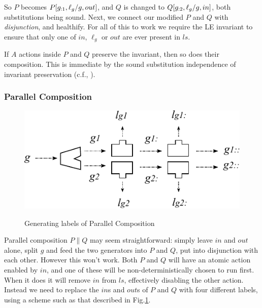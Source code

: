 So $P$ becomes $P[g_{:1},\ell_g/g,out]$,
and $Q$ is changed to $Q[g_{:2},\ell_g/g,in]$, both substitutions being sound.
Next, we connect our modified $P$ and $Q$ with \emph{disjunction},
and healthify.
For all of this to work we require the LE invariant
to ensure that only one of $in$, $\ell_g$ or $out$
are ever present in $ls$.


If $A$ actions inside $P$ and $Q$ preserve the invariant,
then so does their composition.
This is immediate by the sound substitution independence
of invariant preservation (c.f., ).



\newpage
\subsubsection{Parallel Composition}

\begin{figure}[h]
  \centering
  \includegraphics{images/parallel-label-gen}\\
  \caption{Generating labels of Parallel Composition}
  \label{fig:par-lbl-gen}
\end{figure}
Parallel composition $P\parallel Q$ may seem straightforward:
simply leave $in$ and $out$ alone, split $g$ and feed the
two generators into $P$ and $Q$, put into disjunction with each other.
However this won't work. Both $P$ and $Q$ will
have an atomic action enabled by $in$,
and one of these will be non-deterministically chosen to run first.
When it does it will remove $in$ from $ls$,
effectively disabling the other action.
Instead we need to replace the $in$s and $out$s of $P$ and $Q$
with four different labels, using a scheme such as that described
in Fig.\ref{fig:par-lbl-gen}.

